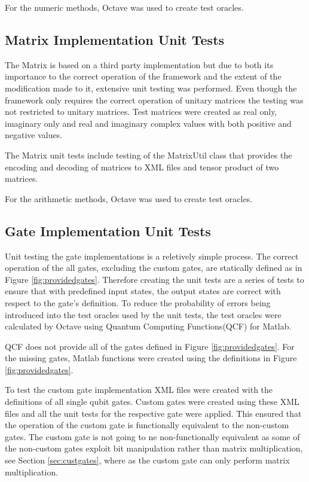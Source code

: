 For the numeric methods, Octave\cite{octweb} was used to create test oracles.

\subsection{Matrix Implementation Unit Tests}
The Matrix is based on a third party implementation but due to both its importance to the correct operation of the framework and the extent of the modification made to it, extensive unit testing was performed.
Even though the framework only requires the correct operation of unitary matrices the testing was not restricted to unitary matrices.
Test matrices were created as real only,  imaginary only and real and imaginary complex values with both positive and negative values.

The Matrix unit tests include testing of the MatrixUtil class that provides the encoding and decoding of matrices to XML files and tensor product of two matrices.

For the arithmetic methods, Octave\cite{octweb} was used to create test oracles.

\subsection{Gate Implementation Unit Tests}
Unit testing the gate implementations is a reletively simple process.
The correct operation of the all gates, excluding the custom gates, are statically defined as in Figure \ref{fig:providedgates}.
Therefore creating the unit tests are a series of tests to ensure that with predefined input states, the output states are correct with respect to the gate's definition.
To reduce the probability of errors being introduced into the test oracles used by the unit tests, the test oracles were calculated by Octave\cite{octweb} using Quantum Computing Functions(QCF) for Matlab\cite{qcfweb}.

QCF does not provide all of the gates defined in Figure \ref{fig:providedgates}.
For the missing gates, Matlab functions were created using the definitions in Figure \ref{fig:providedgates}.

To test the custom gate implementation XML files were created with the definitions of all single qubit gates.
Custom gates were created using these XML files and all the unit tests for the respective gate were applied.
This ensured that the operation of the custom gate is functionally equivalent to the non-custom gates.
The custom gate is not going to ne non-functionally equivalent as some of the non-custom gates exploit bit manipulation rather than matrix multiplication, see Section \ref{sec:custgates}, where as the custom gate can only perform matrix multiplication.

